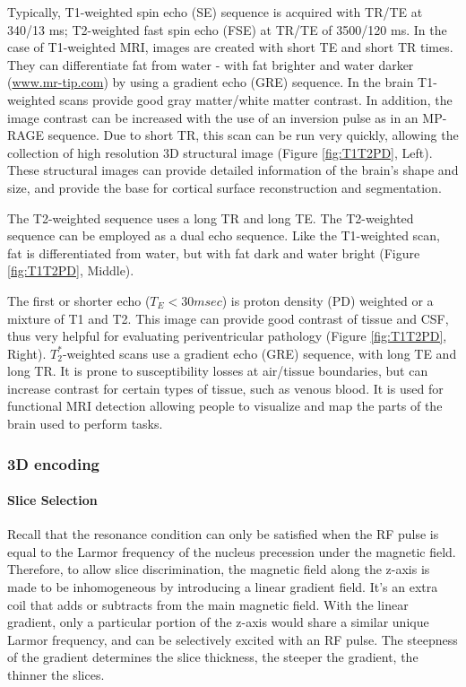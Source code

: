 Typically, T1-weighted spin echo (SE)  sequence is acquired with TR/TE at 340/13 ms; T2-weighted fast spin echo (FSE) at TR/TE of 3500/120 ms. 
In the case of T1-weighted MRI, images are created with short TE and short TR times. They can differentiate fat from water - with fat brighter and water darker (\url{www.mr-tip.com}) by using a gradient echo (GRE) sequence. In the brain T1-weighted scans provide good gray matter/white matter contrast. In addition, the image contrast can be increased with the use of an inversion pulse as in an MP-RAGE sequence. Due to short TR, this scan can be run very quickly, allowing the collection of high resolution 3D structural image (Figure \ref{fig:T1T2PD}, Left). These structural images can provide detailed information of the brain's shape and size, and provide the base for cortical surface reconstruction and segmentation. 

The T2-weighted sequence uses a long TR and long TE. The T2-weighted sequence can be employed as a dual echo sequence. Like the T1-weighted scan, fat is
differentiated from water, but with fat dark and water bright (Figure \ref{fig:T1T2PD}, Middle).  

The first or shorter echo ($T_E<30msec$) is proton density (PD) weighted or a mixture of T1 and T2. This image can provide good contrast of tissue and CSF, thus very helpful for evaluating periventricular pathology (Figure \ref{fig:T1T2PD}, Right). $T_2^*$-weighted scans use a gradient echo (GRE) sequence, with long TE and long TR. It is prone to susceptibility losses at air/tissue boundaries, but can increase contrast for certain types of tissue, such as venous blood. It is used for functional MRI detection allowing people to visualize and map the parts of the brain used to perform tasks. 

\subsubsection{3D encoding}

\paragraph{Slice Selection} Recall that the resonance condition can only be satisfied when the RF pulse is equal to the Larmor frequency of the nucleus precession under the magnetic field. 
Therefore, to allow slice discrimination, the magnetic field along the z-axis is made to be inhomogeneous by introducing a linear gradient field. It's an extra coil that adds or subtracts from the main magnetic field. With the linear gradient, only a particular portion of the z-axis would share a similar unique Larmor frequency, and can be selectively excited with an RF pulse. The steepness of the gradient determines the slice thickness, the steeper the gradient, the thinner the slices.  

